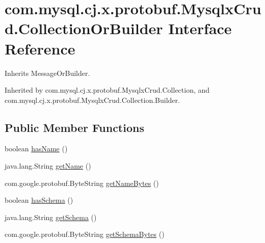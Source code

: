 \hypertarget{interfacecom_1_1mysql_1_1cj_1_1x_1_1protobuf_1_1_mysqlx_crud_1_1_collection_or_builder}{}\section{com.\+mysql.\+cj.\+x.\+protobuf.\+Mysqlx\+Crud.\+Collection\+Or\+Builder Interface Reference}
\label{interfacecom_1_1mysql_1_1cj_1_1x_1_1protobuf_1_1_mysqlx_crud_1_1_collection_or_builder}


Inherits Message\+Or\+Builder.



Inherited by com.\+mysql.\+cj.\+x.\+protobuf.\+Mysqlx\+Crud.\+Collection, and com.\+mysql.\+cj.\+x.\+protobuf.\+Mysqlx\+Crud.\+Collection.\+Builder.

\subsection*{Public Member Functions}
\begin{DoxyCompactItemize}
\item 
boolean \mbox{\hyperlink{interfacecom_1_1mysql_1_1cj_1_1x_1_1protobuf_1_1_mysqlx_crud_1_1_collection_or_builder_ab14de36ef365a090b601ee52815f025b}{has\+Name}} ()
\item 
java.\+lang.\+String \mbox{\hyperlink{interfacecom_1_1mysql_1_1cj_1_1x_1_1protobuf_1_1_mysqlx_crud_1_1_collection_or_builder_a805acaf3cbefd4d9de9793f232aa6c8f}{get\+Name}} ()
\item 
com.\+google.\+protobuf.\+Byte\+String \mbox{\hyperlink{interfacecom_1_1mysql_1_1cj_1_1x_1_1protobuf_1_1_mysqlx_crud_1_1_collection_or_builder_ac59ca98250a5f034579132de8d10343e}{get\+Name\+Bytes}} ()
\item 
boolean \mbox{\hyperlink{interfacecom_1_1mysql_1_1cj_1_1x_1_1protobuf_1_1_mysqlx_crud_1_1_collection_or_builder_a982bc75dcdbd663d3d32919152dd19a0}{has\+Schema}} ()
\item 
java.\+lang.\+String \mbox{\hyperlink{interfacecom_1_1mysql_1_1cj_1_1x_1_1protobuf_1_1_mysqlx_crud_1_1_collection_or_builder_ab0b6bd32b4e0aa8766d5524d36027bf8}{get\+Schema}} ()
\item 
com.\+google.\+protobuf.\+Byte\+String \mbox{\hyperlink{interfacecom_1_1mysql_1_1cj_1_1x_1_1protobuf_1_1_mysqlx_crud_1_1_collection_or_builder_a9235970dd40f6a4353b26269bf31405f}{get\+Schema\+Bytes}} ()
\end{DoxyCompactItemize}


